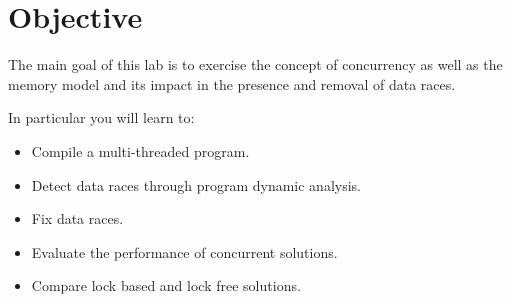 \section{Objective}

The main goal of this lab is to exercise the concept of concurrency as well as
the memory model and its impact in the presence and removal of data races.

In particular you will learn to:


\begin{itemize}

  \item Compile a multi-threaded program.
  \item Detect data races through program dynamic analysis.
  \item Fix data races.
  \item Evaluate the performance of concurrent solutions.
  \item Compare lock based and lock free solutions.

\end{itemize}

